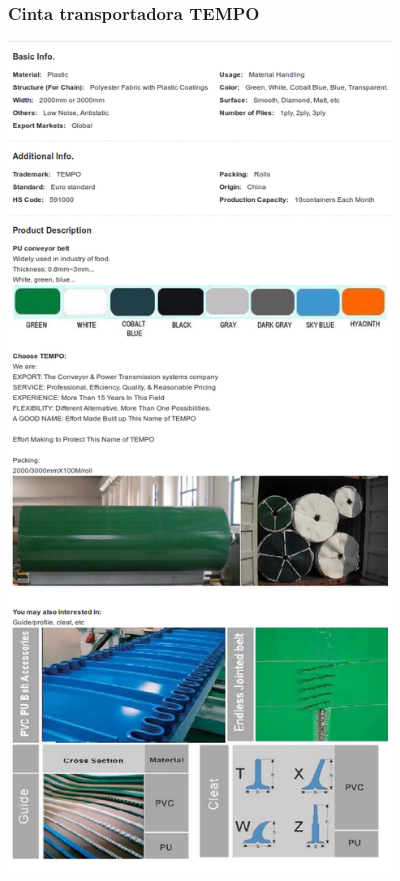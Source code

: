 \subsubsection{Cinta transportadora TEMPO}
\includegraphics[height=22cm,keepaspectratio]{Datasheets/11Cinta.png} 
\newpage

